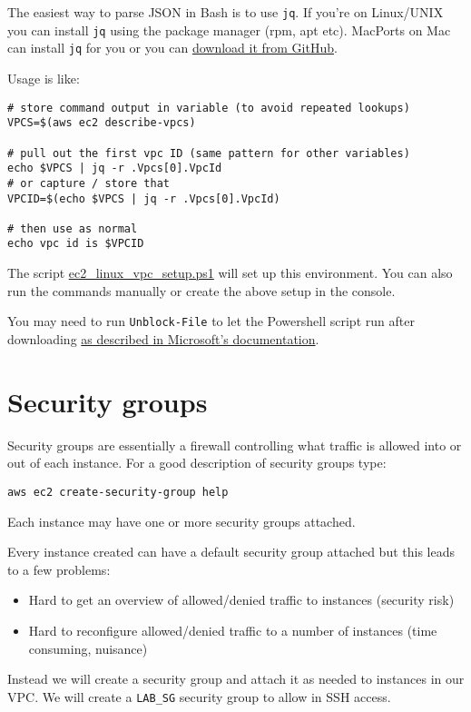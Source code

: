\documentclass{pgnotes}
\begin{document}
The easiest way to parse JSON in Bash is to use \texttt{jq}.
If you're on Linux/UNIX you can install \texttt{jq} using the package manager (rpm, apt etc).
MacPorts on Mac can install \texttt{jq} for you or you can \href{https://stedolan.github.io/jq/}{download it from GitHub}.

Usage is like:
\begin{verbatim}
# store command output in variable (to avoid repeated lookups)
VPCS=$(aws ec2 describe-vpcs)

# pull out the first vpc ID (same pattern for other variables)
echo $VPCS | jq -r .Vpcs[0].VpcId
# or capture / store that
VPCID=$(echo $VPCS | jq -r .Vpcs[0].VpcId)

# then use as normal
echo vpc id is $VPCID
\end{verbatim}

The script \url{ec2_linux_vpc_setup.ps1} will set up this environment.
You can also run the commands manually or create the above setup in the console. 

You may need to run \texttt{Unblock-File} to let the Powershell script run after downloading \href{https://docs.microsoft.com/en-us/powershell/module/microsoft.powershell.utility/unblock-file?view=powershell-7}{as described in Microsoft's documentation}.

\section{Security groups}

Security groups are essentially a firewall controlling what traffic is allowed into or out of each instance.
For a good description of security groups type:
\begin{verbatim}
aws ec2 create-security-group help
\end{verbatim}

Each instance may have one or more security groups attached.

Every instance created can have a default security group attached but this leads to a few problems:
\begin{itemize}
\item Hard to get an overview of allowed/denied traffic to instances (security risk)
\item Hard to reconfigure allowed/denied traffic to a number of instances (time consuming, nuisance)
\end{itemize}
Instead we will create a security group and attach it as needed to instances in our VPC.
We will create a \texttt{LAB\_SG} security group to allow in SSH access.
\end{document}
